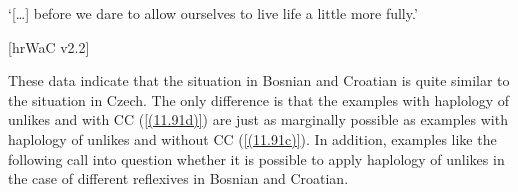 \begin{exe}\ex
\begin{xlist}
\end{xlist}
\glt ‘[\dots] before we dare to allow ourselves to live life a little more fully.’ \\
\strut\hfill [hrWaC v2.2]
\end{exe}

\noindent These data indicate that the situation in Bosnian and Croatian is quite similar to the situation in Czech. The only difference is that the examples with haplology of unlikes and with CC (\ref{(11.91d)}) are just as marginally possible as examples with haplology of unlikes and without CC (\ref{(11.91c)}). In addition, examples like the following call into question whether it is possible to apply haplology of unlikes in the case of different reflexives in Bosnian and Croatian.

